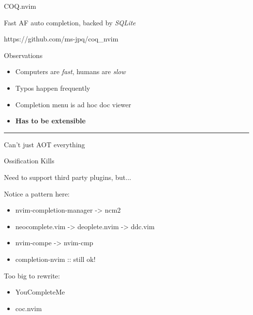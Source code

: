 \documentclass{beamer}
\begin{document}
\begin{frame}{COQ.nvim}

	Fast AF auto completion, backed by \textit{SQLite}

	https://github.com/ms-jpq/coq\_nvim
	
	\begin{block}{Observations}

		\begin{itemize}

			\item Computers are \textit{fast}, humans are \textit{slow}

			\item Typos happen frequently

			\item Completion menu is ad hoc doc viewer

			\item \textbf{Has to be extensible}

		\end{itemize}
 	
	\end{block}

	\rule{\textwidth}{0.1em}

	Can't just AOT everything

\end{frame}


\begin{frame}{Ossification Kills}

	Need to support third party plugins, but...

	Notice a pattern here:

	\begin{itemize}

		\item nvim-completion-manager -> ncm2

		\item neocomplete.vim -> deoplete.nvim -> ddc.vim

		\item nvim-compe -> nvim-cmp

		\item completion-nvim :: still ok!

	\end{itemize}

	Too big to rewrite:

	\begin{itemize}

		\item YouCompleteMe

		\item coc.nvim

	\end{itemize}

\end{frame}
\end{document}
